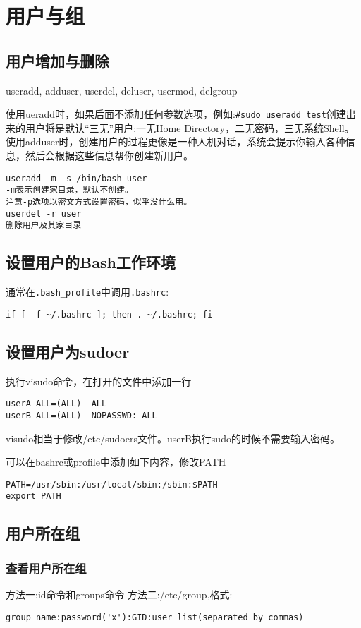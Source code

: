 \section{用户与组}

\subsection{用户增加与删除}
useradd, adduser, userdel, deluser, usermod, delgroup

使用ueradd时，如果后面不添加任何参数选项，例如:\verb+#sudo useradd test+创建出来的用户将是默认“三无”用户:一无Home Directory，二无密码，三无系统Shell。
使用adduser时，创建用户的过程更像是一种人机对话，系统会提示你输入各种信息，然后会根据这些信息帮你创建新用户。
\begin{verbatim}
useradd -m -s /bin/bash user 
-m表示创建家目录，默认不创建。
注意-p选项以密文方式设置密码，似乎没什么用。
userdel -r user
删除用户及其家目录
\end{verbatim}


\subsection{设置用户的Bash工作环境}

通常在\verb|.bash_profile|中调用\verb|.bashrc|:
\begin{verbatim}
if [ -f ~/.bashrc ]; then . ~/.bashrc; fi
\end{verbatim}


\subsection{设置用户为sudoer}
执行visudo命令，在打开的文件中添加一行
\begin{verbatim}
userA ALL=(ALL)  ALL
userB ALL=(ALL)  NOPASSWD: ALL
\end{verbatim}
visudo相当于修改/etc/sudoers文件。userB执行sudo的时候不需要输入密码。

可以在bashrc或profile中添加如下内容，修改PATH
\begin{verbatim}
PATH=/usr/sbin:/usr/local/sbin:/sbin:$PATH
export PATH
\end{verbatim}



\subsection{用户所在组}

\subsubsection{查看用户所在组}
方法一:id命令和groups命令
方法二:/etc/group,格式:
\begin{verbatim}
group_name:password('x'):GID:user_list(separated by commas)
\end{verbatim}

